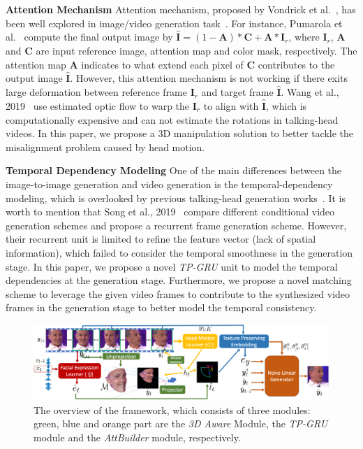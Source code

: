 \documentclass[runningheads]{llncs}
\begin{document}
\noindent \textbf{Attention Mechanism} \quad Attention mechanism, proposed by Vondrick et al.~\cite{vondrick2016generating}, has been well explored in image/video generation task~\cite{vondrick2016generating,wang2018vid2vid,pumarola2019ganimation,chen2019hierarchical}. For instance, Pumarola et al.~\cite{pumarola2019ganimation} compute the final output image by $\hat{\mathbf{I}} = (1 - \mathbf{A}) * \mathbf{C} + \mathbf{A} * \mathbf{I}_r $, where $\mathbf{I}_r$, $\mathbf{A}$ and $\mathbf{C}$ are input reference image, attention map and color mask, respectively. The attention map $\mathbf{A}$ indicates to what extend each pixel of $\mathbf{C}$ contributes to the output image $\hat{\mathbf{I}}$. However, this attention mechanism is not working if there exits large deformation between reference frame $\mathbf{I}_r$ and target frame $\hat{\mathbf{I}}$. Wang et al., 2019~\cite{wang2018high} use estimated optic flow to warp the $\mathbf{I}_r$ to align with $\hat{\mathbf{I}}$, which is computationally expensive and can not estimate the rotations in talking-head videos. In this paper, we propose a 3D manipulation solution to better tackle the misalignment problem caused by head motion. 

\noindent \textbf{Temporal Dependency Modeling} \quad 
One of the main differences between the image-to-image generation and video generation is the temporal-dependency modeling, which is overlooked by previous talking-head generation works~\cite{chung2017you,wiles2018x2face,zakharov2019few,chen2018lip}. It is worth to mention that Song et al., 2019~\cite{ijcai2019-129} compare different conditional video generation schemes and propose a recurrent frame generation scheme. However, their recurrent unit is limited to refine the feature vector (lack of spatial information), which failed to consider the temporal smoothness in the generation stage. In this paper, we propose a novel \textit{TP-GRU} unit to model the temporal dependencies at the generation stage. Furthermore, we propose a novel matching scheme to leverage the given video frames to contribute to the synthesized video frames in the generation stage to better model the temporal consistency.
\begin{figure}[t]
\includegraphics[width=1.0 \linewidth]{latex/images/main.pdf}
\caption{The overview of the framework, which consists of three modules: green, blue and orange part are the \textit{3D Aware} Module, the \textit{TP-GRU} module and the \textit{AttBuilder} module, respectively.}
\label{fig:main}
\end{figure}
\end{document}
